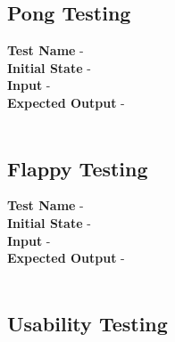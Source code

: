 \documentclass[12pt, titlepage]{article}
\begin{document}
\subsection{Pong Testing}

\textbf{Test Name} - \\
\textbf{Initial State} - \\
\textbf{Input} - \\
\textbf{Expected Output} - \\ \\ 

\subsection{Flappy Testing}

\textbf{Test Name} - \\
\textbf{Initial State} - \\
\textbf{Input} - \\
\textbf{Expected Output} - \\ \\ 

\subsection{Usability Testing}
\end{document}
